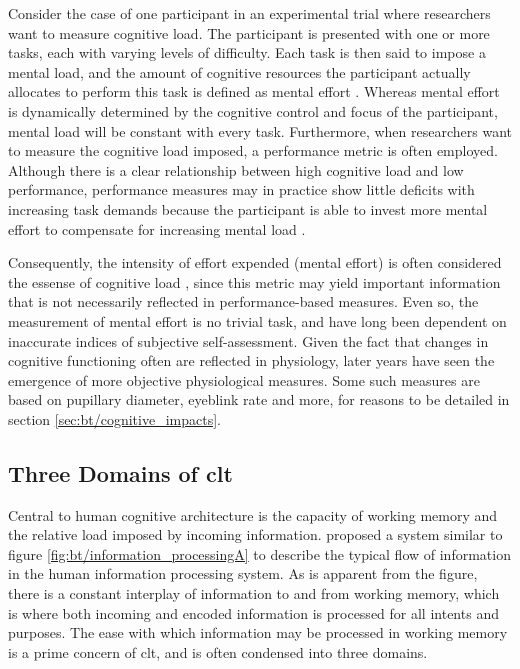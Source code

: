 Consider the case of one participant in an experimental trial where researchers want to measure cognitive load. The participant is presented with one or more tasks, each with varying levels of difficulty. Each task is then said to impose a mental load, and the amount of cognitive resources the participant actually allocates to perform this task is defined as mental effort \cite{paas1994B}. Whereas mental effort is dynamically determined by the cognitive control and focus of the participant, mental load will be constant with every task. Furthermore, when researchers want to measure the cognitive load imposed, a performance metric is often employed. Although there is a clear relationship between high cognitive load and low performance, performance measures may in practice show little deficits with increasing task demands because the participant is able to invest more mental effort to compensate for increasing mental load \cite{tulga1980}.

Consequently, the intensity of effort expended (mental effort) is often considered the essense of cognitive load \cite{hamilton1979}, since this metric may yield important information that is not necessarily reflected in performance-based measures. Even so, the measurement of mental effort is no trivial task, and have long been dependent on inaccurate indices of subjective self-assessment. Given the fact that changes in cognitive functioning often are reflected in physiology, later years have seen the emergence of more objective physiological measures. Some such measures are based on pupillary diameter, eyeblink rate and more, for reasons to be detailed in section \ref{sec:bt/cognitive_impacts}.

\subsection{Three Domains of \acrlong{clt}} \label{sec:bt/CLT/domains}



Central to human cognitive architecture is the capacity of working memory and the relative load imposed by incoming information. \textcite{sweller1988} proposed a system similar to figure \ref{fig:bt/information_processingA} to describe the typical flow of information in the human information processing system. As is apparent from the figure, there is a constant interplay of information to and from working memory, which is where both incoming and encoded information is processed for all intents and purposes. The ease with which information may be processed in working memory is a prime concern of \acrshort{clt}, and is often condensed into three domains.

